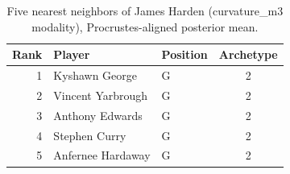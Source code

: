 \begin{table}[htbp]
  \centering\small
  \begin{tabular}{rllc}
    \toprule
    Rank & Player & Position & Archetype \\
    \midrule
    1 & Kyshawn George & G & 2 \\
    2 & Vincent Yarbrough & G & 2 \\
    3 & Anthony Edwards & G & 2 \\
    4 & Stephen Curry & G & 2 \\
    5 & Anfernee Hardaway & G & 2 \\
    \bottomrule
  \end{tabular}
  \caption{Five nearest neighbors of James Harden (curvature_m3 modality), Procrustes-aligned posterior mean.}
  \label{tab:James_Harden_neighbors_curvature_m3}
\end{table}

